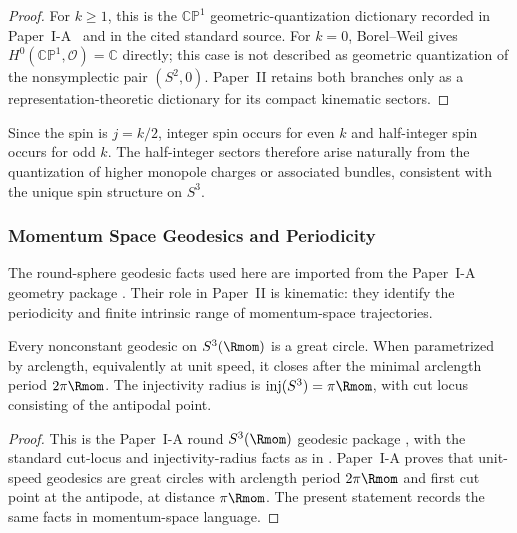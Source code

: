 \documentclass[11pt,a4paper]{article}
\begin{document}
\begin{proof}
For \(k\ge1\), this is the \(\mathbb{CP}^1\)
geometric-quantization dictionary recorded in
Paper~I-A~\cite{Kugelmann2026a} and in the cited standard source.  For
\(k=0\), Borel--Weil gives
\(H^0(\mathbb{CP}^1,\mathcal O)=\mathbb C\) directly; this case is not
described as geometric quantization of the nonsymplectic pair
\((S^2,0)\).  Paper~II retains both branches only as a
representation-theoretic dictionary for its compact kinematic sectors.
\end{proof}



\begin{remark}
Since the spin is \(j=k/2\), integer spin occurs for even \(k\) and half-integer spin occurs for odd \(k\).  The half-integer sectors therefore arise naturally from the quantization of higher monopole charges or associated bundles, consistent with the unique spin structure on \(S^3\).
\end{remark}


\subsubsection{Momentum Space Geodesics and Periodicity}
\label{p2:sec:geodesic-periodicity}

The round-sphere geodesic facts used here are imported from the Paper~I-A geometry package \cite{Kugelmann2026a}.  Their role in Paper~II is kinematic: they identify the periodicity and finite intrinsic range of momentum-space trajectories.

\begin{proposition}
\label{p2:prop:geodesic-closure}
Every nonconstant geodesic on $S^3(\Rmom)$ is a great circle.  When parametrized by arclength, equivalently at unit speed, it closes after the minimal arclength period $2\pi \Rmom$.
The injectivity radius is $\mathrm{inj}(S^3) = \pi \Rmom$, with cut locus consisting 
of the antipodal point.
\end{proposition}

\begin{proof}
This is the Paper~I-A round \(S^3(\Rmom)\) geodesic package \cite{Kugelmann2026a}, with the standard cut-locus and injectivity-radius facts as in \cite{do1992riemannian}.  Paper~I-A proves that unit-speed geodesics are great circles with arclength period \(2\pi\Rmom\) and first cut point at the antipode, at distance \(\pi\Rmom\).  The present statement records the same facts in momentum-space language.
\end{proof}
\end{document}
